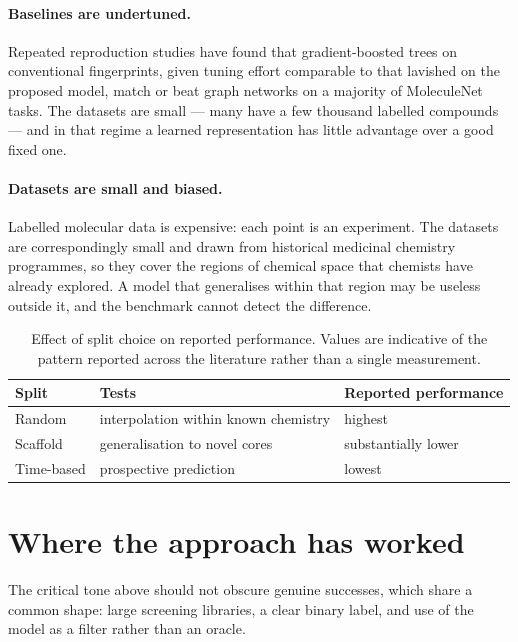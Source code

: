 \documentclass[11pt,a4paper]{article}
\begin{document}
\paragraph{Baselines are undertuned.}
Repeated reproduction studies have found that gradient-boosted trees on
conventional fingerprints, given tuning effort comparable to that lavished on
the proposed model, match or beat graph networks on a majority of MoleculeNet
tasks. The datasets are small --- many have a few thousand labelled compounds
--- and in that regime a learned representation has little advantage over a
good fixed one.

\paragraph{Datasets are small and biased.}
Labelled molecular data is expensive: each point is an experiment. The
datasets are correspondingly small and drawn from historical medicinal
chemistry programmes, so they cover the regions of chemical space that
chemists have already explored. A model that generalises within that region
may be useless outside it, and the benchmark cannot detect the difference.

\begin{table}[htbp]
  \centering
  \caption{Effect of split choice on reported performance. Values are
           indicative of the pattern reported across the literature rather
           than a single measurement.}
  \label{tab:splits}
  \begin{tabular}{lll}
    \toprule
    \textbf{Split} & \textbf{Tests} & \textbf{Reported performance} \\
    \midrule
    Random             & interpolation within known chemistry & highest \\
    Scaffold           & generalisation to novel cores        & substantially lower \\
    Time-based         & prospective prediction               & lowest \\
    \bottomrule
  \end{tabular}
\end{table}

\section{Where the approach has worked}
\label{sec:success}

The critical tone above should not obscure genuine successes, which share a
common shape: large screening libraries, a clear binary label, and use of the
model as a filter rather than an oracle.
\end{document}
